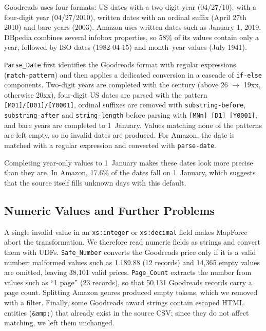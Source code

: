 \documentclass[runningheads]{llncs}
\begin{document}
Goodreads uses four formats: US dates with a two-digit year (04/27/10), with a
four-digit year (04/27/2010), written dates with an ordinal suffix (April 27th
2010) and bare years (2003). Amazon uses written dates such as January 1,
2019. DBpedia combines several infobox properties, so 58\% of its values
contain only a year, followed by ISO dates (1982-04-15) and month--year values
(July 1941).

\texttt{Parse\_Date} first identifies the Goodreads format with regular
expressions (\texttt{match-pattern}) and then applies a dedicated conversion
in a cascade of \texttt{if-else} components. Two-digit years are completed
with the century (above 26 $\rightarrow$ 19xx, otherwise 20xx), four-digit US
dates are parsed with the pattern \texttt{[M01]/[D01]/[Y0001]}, ordinal
suffixes are removed with \texttt{substring-before}, \texttt{substring-after}
and \texttt{string-length} before parsing with \texttt{[MNn] [D1] [Y0001]},
and bare years are completed to 1~January. Values matching none of the
patterns are left empty, so no invalid dates are produced. For Amazon, the
date is matched with a regular expression and converted with
\texttt{parse-date}. %

Completing year-only values to 1~January makes these dates look more precise
than they are. In Amazon, 17.6\% of the dates fall on 1~January, which
suggests that the source itself fills unknown days with this default.

\subsection{Numeric Values and Further Problems}
A single invalid value in an \texttt{xs:integer} or \texttt{xs:decimal} field
makes MapForce abort the transformation. We therefore read numeric fields as
strings and convert them with UDFs. \texttt{Safe\_Number} converts the
Goodreads price only if it is a valid number; malformed values such as
1.189.88 (12 records) and 14,365 empty values are omitted, leaving 38,101
valid prices. \texttt{Page\_Count} extracts the number from values such as
``1 page'' (23 records), so that 50,131 Goodreads records carry a page count.
Splitting Amazon genres produced empty tokens, which we removed with a
filter. Finally, some Goodreads award strings contain escaped HTML entities
(\texttt{\&amp;}) that already exist in the source CSV; since they do not
affect matching, we left them unchanged.

\end{document}

